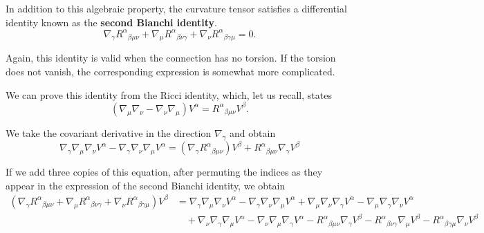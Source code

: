 \begin{points}
\item In addition to this algebraic property, the curvature tensor satisfies a differential identity known as the \textbf{second Bianchi identity}.
\[
  \nabla_\gamma R^\alpha{}_{\beta\mu\nu}+\nabla_\mu R^\alpha{}_{\beta\nu\gamma}+\nabla_\nu R^\alpha{}_{\beta\gamma\mu}=0 .
\]

\item Again, this identity is valid when the connection has no torsion. If the torsion does not vanish, the corresponding expression is somewhat more complicated.

\item We can prove this identity from the Ricci identity, which, let us recall, states
\[
  \left(\nabla_\mu\nabla_\nu-\nabla_\nu\nabla_\mu\right)V^\alpha=R^\alpha{}_{\beta\mu\nu}V^\beta .
\]

\item We take the covariant derivative in the direction $\nabla_\gamma$ and obtain
\[
  \nabla_\gamma\nabla_\mu\nabla_\nu V^\alpha-\nabla_\gamma\nabla_\nu\nabla_\mu V^\alpha=\left(\nabla_\gamma R^\alpha{}_{\beta\mu\nu}\right)V^\beta+R^\alpha{}_{\beta\mu\nu}\nabla_\gamma V^\beta
\]

\item If we add three copies of this equation, after permuting the indices as they appear in the expression of the second Bianchi identity, we obtain
\begin{align*}
  \left(\nabla_\gamma R^\alpha{}_{\beta\mu\nu}+\nabla_\mu R^\alpha{}_{\beta\nu\gamma}+\nabla_\nu R^\alpha{}_{\beta\gamma\mu}\right)V^\beta&=\nabla_\gamma\nabla_\mu\nabla_\nu V^\alpha-\nabla_\gamma\nabla_\nu\nabla_\mu V^\alpha+\nabla_\mu\nabla_\nu\nabla_\gamma V^\alpha-\nabla_\mu\nabla_\gamma\nabla_\nu V^\alpha\\
  &\quad+\nabla_\nu\nabla_\gamma\nabla_\mu V^\alpha-\nabla_\nu\nabla_\mu\nabla_\gamma V^\alpha-R^\alpha{}_{\beta\mu\nu}\nabla_\gamma V^\beta-R^\alpha{}_{\beta\nu\gamma}\nabla_\mu V^\beta-R^\alpha{}_{\beta\gamma\mu}\nabla_\nu V^\beta
\end{align*}


\end{points}
